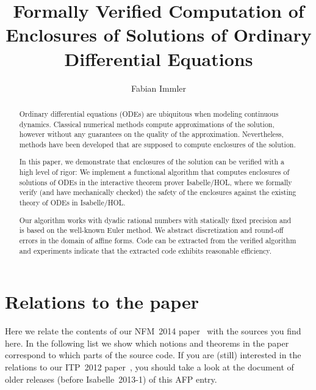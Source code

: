 \documentclass[11pt,a4paper]{article}
\title{Formally Verified Computation of Enclosures of Solutions of Ordinary
Differential Equations}
\author{Fabian Immler}
\begin{document}
\maketitle

\begin{abstract}

Ordinary differential equations (ODEs) are ubiquitous when modeling continuous
dynamics. Classical numerical methods compute approximations of the solution,
however without any guarantees on the quality of the approximation.
Nevertheless, methods have been developed that are supposed to compute
enclosures of the solution.

In this paper, we demonstrate that enclosures of the solution can be verified
with a high level of rigor: We implement a functional algorithm that computes
enclosures of solutions of ODEs in the interactive theorem prover Isabelle/HOL,
where we formally verify (and have mechanically checked) the safety of the
enclosures against the existing theory of ODEs in Isabelle/HOL.

Our algorithm works with dyadic rational numbers with statically fixed precision
and is based on the well-known Euler method. We abstract discretization and
round-off errors in the domain of affine forms. Code can be extracted from the
verified algorithm and experiments indicate that the extracted code exhibits
reasonable efficiency.

\end{abstract}

\section{Relations to the paper}

Here we relate the contents of our NFM~2014 paper~\cite{Immler2014} with the sources you find here.
In the following list we show which notions and theorems in the
paper correspond to which parts of the source code. If you are (still) interested in the relations
to our ITP~2012 paper~\cite{immlerhoelzl}, you should take a look at the document of older releases
 (before Isabelle~2013-1) of this AFP entry.
\end{document}
